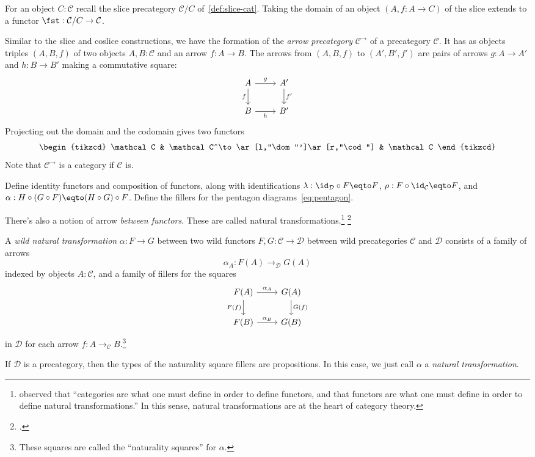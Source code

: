 \begin{example}
  For an object $C : \mathcal C$ recall the slice precategory
  $\mathcal C/C$ of~\cref{def:slice-cat}.
  Taking the domain of an object $(A,f:A\to C)$ of the slice
  extends to a functor $\fst : \mathcal C/C \to \mathcal C$.
\end{example}
\begin{example}
  Similar to the slice and coslice constructions,
  we have the formation of the \emph{arrow precategory} $\mathcal C^\to$
  of a precategory $\mathcal C$.
  It has as objects triples $(A,B,f)$ of two objects $A,B:\mathcal C$
  and an arrow $f: A\to B$.
  The arrows from $(A,B,f)$ to $(A',B',f')$ are pairs of arrows
  $g : A \to A'$ and $h : B\to B'$ making a commutative square:
  \[
    \begin{tikzcd}
      A \ar[d,"f"']\ar[r,"g"] & A'\ar[d,"f'"] \\
      B \ar[r,"h"'] & B'
    \end{tikzcd}
  \]
  Projecting out the domain and the codomain gives
  two functors
  \[
    \begin{tikzcd}
      \mathcal C & \mathcal C^\to \ar[l,"\dom"']\ar[r,"\cod"] & \mathcal C
    \end{tikzcd}
  \]
  Note that $\mathcal C^\to$ is a category if $\mathcal C$ is.
\end{example}
\begin{xca}
  Define identity functors and composition of functors,
  along with identifications $\lambda : \id_{\mathcal D}\circ F \eqto F$,
  $\rho : F \circ \id_{\mathcal C} \eqto F$,
  and $\alpha : H\circ (G \circ F) \eqto (H \circ G)\circ F$.
  Define the fillers for the pentagon diagrams~\eqref{eq:pentagon}.
\end{xca}
There's also a notion of arrow \emph{between functors}.
These are called natural transformations.\footnote{%
  \citeauthor{Freyd1964}\footnotemark{} observed that ``categories are what one must define
  in order to define functors, and that functors are what one must define
  in order to define natural transformations.''
  In this sense, natural transformations are at the heart of category theory.}%
\footcitetext{Freyd1964}
\begin{definition}
  A \emph{wild natural transformation}
  $\alpha : F \to G$ between
  two wild functors $F,G : \mathcal C \to \mathcal D$ between
  wild precategories $\mathcal C$ and $\mathcal D$
  consists of a family of arrows
  \[
    \alpha_A : F(A) \to_{\mathcal D} G(A)
  \]
  indexed by objects $A:\mathcal C$,
  and a family of fillers for the squares
  \[
    \begin{tikzcd}
      F(A) \ar[r,"\alpha_A"]\ar[d,"F(f)"'] & G(A) \ar[d,"G(f)"] \\
      F(B) \ar[r,"\alpha_B"] & G(B)
    \end{tikzcd}
  \]
  in $\mathcal D$
  for each arrow $f : A \to_{\mathcal C} B$.\footnote{%
    These squares are called the ``naturality squares'' for $\alpha$.}

  If $\mathcal D$ is a precategory, then the types of the naturality square fillers
  are propositions. In this case, we just call $\alpha$ a \emph{natural transformation}.
\end{definition}
